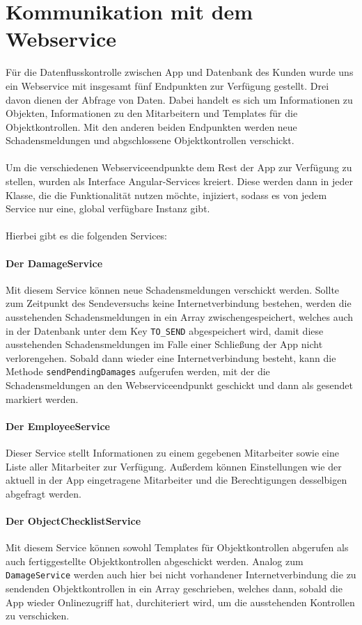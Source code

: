 \documentclass[12pt]{article}
\begin{document}
\section{Kommunikation mit dem Webservice}
Für die Datenflusskontrolle zwischen App und Datenbank des Kunden wurde uns ein Webservice mit insgesamt fünf Endpunkten zur Verfügung gestellt. Drei davon dienen der Abfrage von Daten. Dabei handelt es sich um Informationen zu Objekten, Informationen zu den Mitarbeitern und Templates für die Objektkontrollen. Mit den anderen beiden Endpunkten werden neue Schadensmeldungen und abgschlossene Objektkontrollen verschickt.

\paragraph{}Um die verschiedenen Webserviceendpunkte dem Rest der App zur Verfügung zu stellen, wurden als Interface Angular-Services kreiert. Diese werden dann in jeder Klasse, die die Funktionalität nutzen möchte, injiziert, sodass es von jedem Service nur eine, global verfügbare Instanz gibt.\\ \ \\
Hierbei gibt es die folgenden Services:
\paragraph{Der DamageService}
Mit diesem Service können neue Schadensmeldungen verschickt werden. Sollte zum Zeitpunkt des Sendeversuchs keine Internetverbindung bestehen, werden die ausstehenden Schadensmeldungen in ein Array zwischengespeichert, welches auch in der Datenbank unter dem Key \texttt{TO\_SEND} abgespeichert wird, damit diese ausstehenden Schadensmeldungen im Falle einer Schließung der App nicht verlorengehen. Sobald dann wieder eine Internetverbindung besteht, kann die Methode \texttt{sendPendingDamages} aufgerufen werden, mit der die Schadensmeldungen an den Webserviceendpunkt geschickt und dann als gesendet markiert werden.
\paragraph{Der EmployeeService} Dieser Service stellt Informationen zu einem gegebenen Mitarbeiter sowie eine Liste aller Mitarbeiter zur Verfügung. Außerdem können Einstellungen wie der aktuell in der App eingetragene Mitarbeiter und die Berechtigungen desselbigen abgefragt werden.
\paragraph{Der ObjectChecklistService} Mit diesem Service können sowohl Templates für Objektkontrollen abgerufen als auch fertiggestellte Objektkontrollen abgeschickt werden. Analog zum \texttt{DamageService} werden auch hier bei nicht vorhandener Internetverbindung die zu sendenden Objektkontrollen in ein Array geschrieben, welches dann, sobald die App wieder Onlinezugriff hat, durchiteriert wird, um die ausstehenden Kontrollen zu verschicken.
\end{document}
